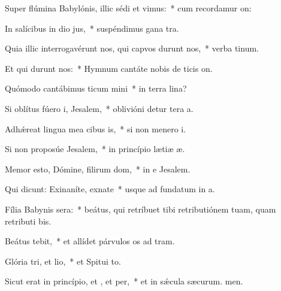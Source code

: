 \item Super flúmina Babylónis, illic sédi et vimus:~* cum recordamur on:
\item In salícibus in dio jus,~* suspéndimus gana tra.
\item Quia illic interrogavérunt nos, qui capvos durunt nos,~* verba tinum.
\item Et qui durunt nos:~* Hymnum cantáte nobis de ticis on.
\item Quómodo cantábimus ticum mini~* in terra lina?
\item Si oblítus fúero i, Jesalem,~* oblivióni detur tera a.
\item Adhǽreat lingua mea cibus is,~* si non menero i.
\item Si non proposúe Jesalem,~* in princípio lætiæ æ.
\item Memor esto, Dómine, filirum dom,~* in e Jesalem.
\item Qui dicunt: Exinaníte, exnate~* usque ad fundatum in a.
\item Fília Babynis sera:~* beátus, qui retríbuet tibi retributiónem tuam, quam retributi bis.
\item Beátus  tebit,~* et allídet párvulos os ad tram.
\item Glória tri, et lio,~* et Spitui to.
\item Sicut erat in princípio, et , et per,~* et in sǽcula sæcurum. men.

